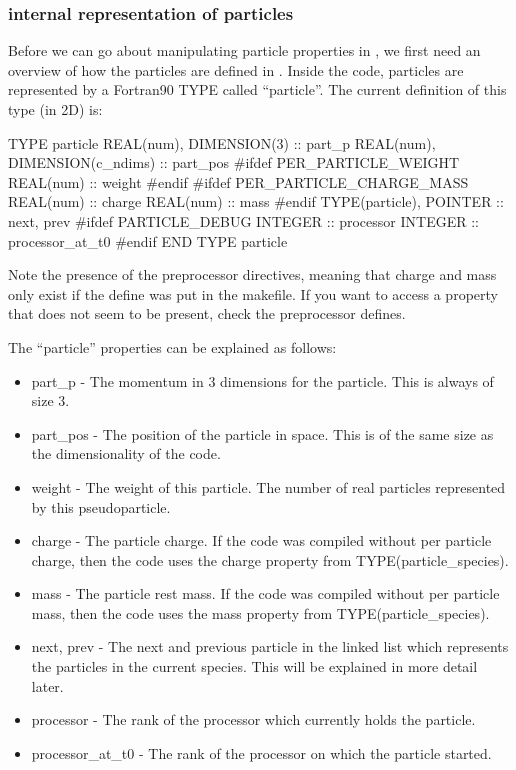 \subsubsection{{\EPOCH} internal representation of particles}
\label{sec:partrep}
Before we can go about manipulating particle properties in
, we first need an overview of how the particles
are defined in {\EPOCH}.
Inside the code, particles are represented by a Fortran90 TYPE called
``particle''. The current definition of this type (in 2D) is:
\begin{boxverbatim}
  TYPE particle
    REAL(num), DIMENSION(3) :: part_p
    REAL(num), DIMENSION(c_ndims) :: part_pos
#ifdef PER_PARTICLE_WEIGHT
    REAL(num) :: weight
#endif
#ifdef PER_PARTICLE_CHARGE_MASS
    REAL(num) :: charge
    REAL(num) :: mass
#endif
    TYPE(particle), POINTER :: next, prev
#ifdef PARTICLE_DEBUG
    INTEGER :: processor
    INTEGER :: processor_at_t0
#endif
  END TYPE particle
\end{boxverbatim}
Note the presence of the preprocessor directives, meaning that charge and mass
only exist if the  define was put in
the makefile. If you want to access a property that does not seem to be
present, check the preprocessor defines.

The ``particle'' properties can be explained as follows:
\begin{itemize}
\item part\_p - The momentum in 3 dimensions for the particle. This is always
  of size 3.
\item part\_pos - The position of the particle in space. This is of the same
  size as the dimensionality of the code.
\item weight - The weight of this particle. The number of real particles
  represented by this pseudoparticle.
\item charge - The particle charge. If the code was compiled without per
  particle charge, then the code uses the charge property from
  TYPE(particle\_species).
\item mass - The particle rest mass. If the code was compiled without per
  particle mass, then the code uses the mass property from
  TYPE(particle\_species).
\item next, prev - The next and previous particle in the linked list which
  represents the particles in the current species. This will be explained in
  more detail later.
\item processor - The rank of the processor which currently holds the
  particle.
\item processor\_at\_t0 - The rank of the processor on which the particle
  started.
\end{itemize}

